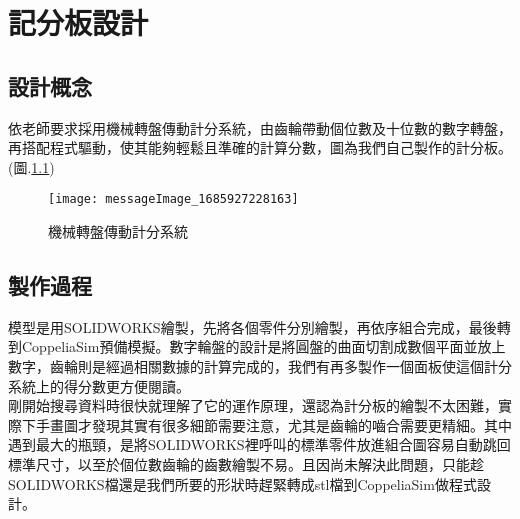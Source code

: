 \chapter{記分板設計}
\section{設計概念}
    依老師要求採用機械轉盤傳動計分系統，由齒輪帶動個位數及十位數的數字轉盤，再搭配程式驅動，使其能夠輕鬆且準確的計算分數，圖為我們自己製作的計分板。(圖.\ref{messageImage_1685927228163})\\
    
\begin{figure}[hbt!]
\center
\texttt{[image: messageImage\_1685927228163]}
\caption{\Large 機械轉盤傳動計分系統}
\label{messageImage_1685927228163}
\end{figure}
    
\section{製作過程}

模型是用SOLIDWORKS繪製，先將各個零件分別繪製，再依序組合完成，最後轉到CoppeliaSim預備模擬。數字輪盤的設計是將圓盤的曲面切割成數個平面並放上數字，齒輪則是經過相關數據的計算完成的，我們有再多製作一個面板使這個計分系統上的得分數更方便閱讀。\\
剛開始搜尋資料時很快就理解了它的運作原理，還認為計分板的繪製不太困難，實際下手畫圖才發現其實有很多細節需要注意，尤其是齒輪的嚙合需要更精細。其中遇到最大的瓶頸，是將SOLIDWORKS裡呼叫的標準零件放進組合圖容易自動跳回標準尺寸，以至於個位數齒輪的齒數繪製不易。且因尚未解決此問題，只能趁SOLIDWORKS檔還是我們所要的形狀時趕緊轉成stl檔到CoppeliaSim做程式設計。\\







